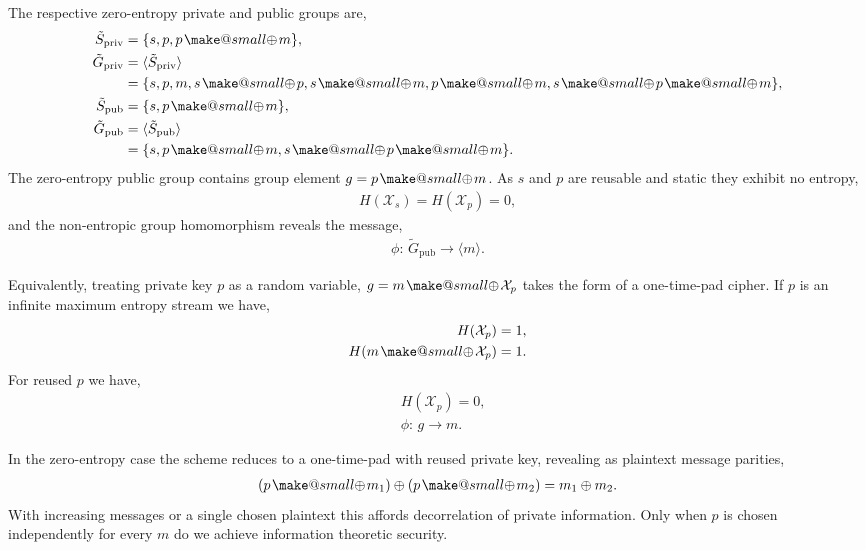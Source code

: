 \documentclass[twocolumn, aps, amsmath, amssymb, nofootinbib, superscriptaddress, longbibliography, doublefloatfix, table-of-contents, eqsecnum, rmp]{revtex4-2}
\makeatletter
\newcommand{\soplus}{{{\hspace{1pt}}{\mathbin{\mathpalette\make@small{\mathbin\oplus}}}}{\hspace{1pt}}}
\newcommand{\make@small}[2]{%
  \vcenter{\hbox{%
    \scalebox{0.6}{$\m@th#1#2$}%
  }}%
}
\makeatother
\begin{document}
The respective zero-entropy private and public groups are,
\begin{align}
	{\tilde S}_\mathrm{priv} &= \{s, p, p \soplus m\},\nonumber\\
	{\tilde G}_\mathrm{priv} &= \langle {\tilde S}_\mathrm{priv} \rangle \nonumber\\
	&= \{s, p, m, s\soplus p, s\soplus m, p\soplus m, s\soplus p\soplus m\},\nonumber\\
	{\tilde S}_\mathrm{pub} &= \{s, p \soplus m\},\nonumber\\
	{\tilde G}_\mathrm{pub} &= \langle {\tilde S}_\mathrm{pub} \rangle \nonumber\\
	&= \{s, p\soplus m, s\soplus p\soplus m\}.
\end{align}
The zero-entropy public group contains group element $g=p\soplus m$. As $s$ and $p$ are reusable and static they exhibit no entropy,
\begin{align}
	H(\mathcal{X}_s)=H(\mathcal{X}_p)=0,	
\end{align}
and the non-entropic group homomorphism reveals the message,
\begin{align}
	\phi:\, \tilde{G}_\mathrm{pub} \to \langle m\rangle.
\end{align}

Equivalently, treating private key $p$ as a random variable, $g=m\soplus \mathcal{X}_p$ takes the form of a one-time-pad cipher. If $p$ is an infinite maximum entropy stream we have,
\begin{align}
	H(\mathcal{X}_p) &= 1,\nonumber\\
	H(m\soplus \mathcal{X}_p) &= 1.
\end{align}
For reused $p$ we have,
\begin{align}
	&H(\mathcal{X}_p) = 0,\nonumber\\
	&\phi: \,g\to m.
\end{align}

In the zero-entropy case the scheme reduces to a one-time-pad with reused private key, revealing as plaintext message parities,
\begin{align}
	(p\soplus m_1) \oplus (p \soplus m_2) = m_1 \oplus m_2.
\end{align}
With increasing messages or a single chosen plaintext this affords decorrelation of private information. Only when $p$ is chosen independently for every $m$ do we achieve information theoretic security.

\end{document}
